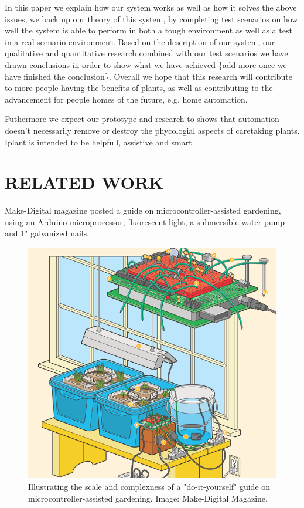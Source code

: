 \documentclass{ubicomp2012}
\begin{document}
In this paper we explain how our system works as well as how it solves the above issues, we back up our theory of this system, by completing test scenarios on how well the system is able to perform in both a tough environment as well as a test in a real scenario environment. Based on the description of our system, our qualitative and quantitative research combined with our test scenarios we have drawn conclusions in order to show what we have achieved \{add more once we have finished the conclusion\}. Overall we hope that this research will contribute to more people having the benefits of plants, as well as contributing to the advancement for people homes of the future, e.g. home automation.

Futhermore we expect our prototype and research to shows that automation doesn't necessarily remove or destroy the phycologial aspects of caretaking plants. Iplant is intended to be helpfull, assistive and smart.

\section{RELATED WORK}
Make-Digital magazine posted a guide on microcontroller-assisted gardening\cite{how-to-make-a-gardening-system}, using an Arduino microprocessor, fluorescent light, a submersible water pump and 1" galvanized nails.

\begin{figure}[h!]
\centering
\includegraphics[width=\columnwidth]{howto-gardening.png}
\caption{Illustrating the scale and complexness of a "do-it-yourself" guide on microcontroller-assisted gardening. Image: Make-Digital Magazine.}
\label{fig:MakeDigitalMagazine}
\end{figure}
\end{document}
